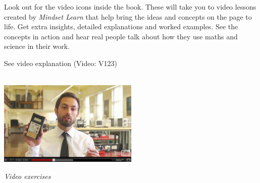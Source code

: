 {\Large

Look out for the video icons inside the book. These will take you to video lessons created by \textit{Mindset
Learn} that help bring the ideas and concepts on the page to life. Get extra insights, detailed
explanations and worked examples. See the concepts in action and hear real people talk about how they
use maths and science in their work. \par

\begin{center}
\caption{See video explanation  (Video: V123)}\\
\includegraphics[width=0.5\textwidth]{../title_images/veritasiumvideo.png}
\end{center}\par

}
\vspace{0.5cm}
{\normalfont\sffamily\fontsize{22}\normalfont\itshape Video exercises} \par

